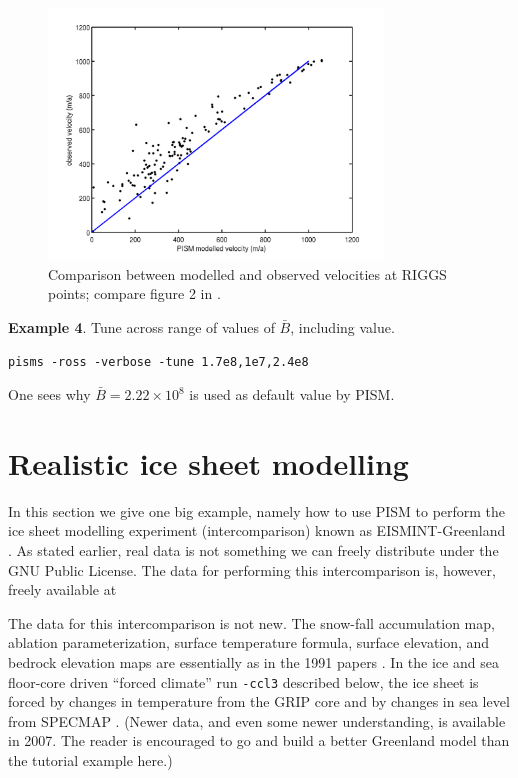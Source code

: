 \documentclass[11pt,final]{amsart}
\begin{document}
\begin{figure}[ht]
\includegraphics[width=3.5in,keepaspectratio=true]{figs/rossscatter}
\caption{Comparison between modelled and observed velocities at RIGGS points; compare figure 2  in \cite{MacAyealetal}.}
\label{fig:rossscatter}
\end{figure}

\noindent\textbf{Example 4}.  Tune across range of values of $\bar B$, including \cite{MacAyealetal}
value.

\verb|pisms -ross -verbose -tune 1.7e8,1e7,2.4e8|

\noindent One sees why $\bar B = 2.22\times 10^8$ is used as default value by PISM.




\clearpage\newpage
\section{Realistic ice sheet modelling}\label{sect:real}

In this section we give one big example, namely how to use PISM to perform the ice sheet modelling experiment (intercomparison) known as EISMINT-Greenland \cite{RitzEISMINT}.  As stated earlier, real data is not something we can freely distribute under the GNU Public License.  The data for performing this intercomparison is, however, freely available at
\medskip

\centerline{}
\medskip

The data for this intercomparison is not new.  The snow-fall accumulation map, ablation parameterization, surface temperature formula, surface elevation, and bedrock elevation maps are essentially as in the 1991 papers \cite{Letreguillyetal1991,OhmuraReeh}.  In the ice and sea floor-core driven ``forced climate'' run \verb|-ccl3| described below, the ice sheet is forced by changes in temperature from the GRIP core \cite{Dansgaardetal1993} and by changes in sea level from SPECMAP \cite{Imbrieetal1984}.  (Newer data, and even some newer understanding, is available in 2007.  The reader is encouraged to go and build a better Greenland model than the tutorial example here.)
\end{document}
